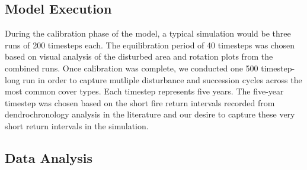\subsection{Model Execution}
During the calibration phase of the model, a typical simulation would be three runs of 200 timesteps each. The equilibration period of 40 timesteps was chosen based on visual analysis of the disturbed area and rotation plots from the combined runs. Once calibration was complete, we conducted one 500 timestep-long run in order to capture mutliple disturbance and succession cycles across the most common cover types. Each timestep represents five years. The five-year timestep was chosen based on the short fire return intervals recorded from dendrochronology analysis in the literature and our desire to capture these very short return intervals in the simulation.

\subsection{Data Analysis}

